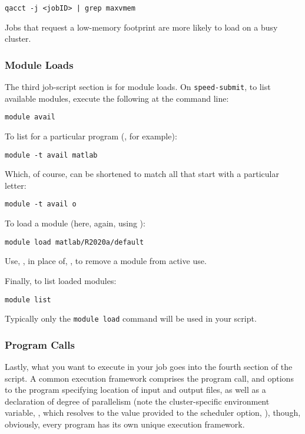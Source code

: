 \documentclass{easychair}
\begin{document}
\begin{verbatim}
qacct -j <jobID> | grep maxvmem
\end{verbatim}

Jobs that request a low-memory footprint are more likely to load on a busy
cluster.

\subsubsection*{Module Loads}
The third job-script section is for module loads. On \texttt{speed-submit}, to list
available modules, execute the following at the command line:

\begin{verbatim}
module avail
\end{verbatim}

To list for a particular program (, for example):

\begin{verbatim}
module -t avail matlab
\end{verbatim}

Which, of course, can be shortened to match all that start with a
particular letter:

\begin{verbatim}
module -t avail o
\end{verbatim}

To load a module (here, again, using ):

\begin{verbatim}
module load matlab/R2020a/default
\end{verbatim}

Use, , in place of, , to remove a module from active use.

Finally, to list loaded modules:

\begin{verbatim}
module list
\end{verbatim}

Typically only the \texttt{module load} command will be used in your script.

\subsubsection*{Program Calls}
Lastly, what you want to execute in your job goes into the fourth section
of the script. A common execution framework comprises the program call,
and options to the program specifying location of input and output files,
as well as a declaration of degree of parallelism (note the
cluster-specific environment variable, , which resolves to the value
provided to the scheduler option, ), though, obviously, every
program has its own unique execution framework.
\end{document}
